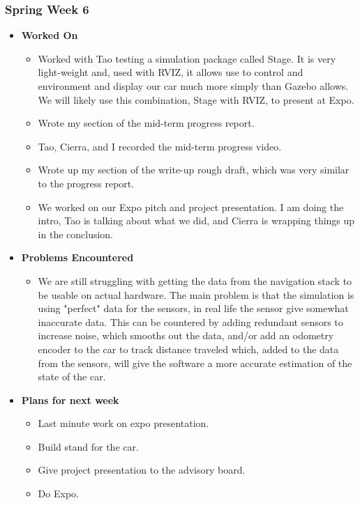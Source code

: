 \documentclass[compsoc,draftclsnofoot,onecolumn,10pt]{IEEEtran}
\begin{document}
\subsubsection{Spring Week 6}
\begin{itemize}
    \item {\textbf{Worked On}}
    \begin{itemize}
        \item Worked with Tao testing a simulation package called Stage. It is very light-weight and, used with RVIZ, it allows use to control and environment and display our car much more simply than Gazebo allows. We will likely use this combination, Stage with RVIZ, to present at Expo.
        \item Wrote my section of the mid-term progress report.
        \item Tao, Cierra, and I recorded the mid-term progress video.
        \item Wrote up my section of the write-up rough draft, which was very similar to the progress report.
        \item We worked on our Expo pitch and project presentation. I am doing the intro, Tao is talking about what we did, and Cierra is wrapping things up in the conclusion.
    \end{itemize}

    \item {\textbf{Problems Encountered}}
    \begin{itemize}
        \item We are still struggling with getting the data from the navigation stack to be usable on actual hardware. The main problem is that the simulation is using "perfect" data for the sensors, in real life the sensor give somewhat inaccurate data. This can be countered by adding redundant sensors to increase noise, which smooths out the data, and/or add an odometry encoder to the car to track distance traveled which, added to the data from the sensors, will give the software a more accurate estimation of the state of the car.
    \end{itemize}

    \item{\textbf{Plans for next week}}
    \begin{itemize}
        \item Last minute work on expo presentation.
        \item Build stand for the car.
        \item Give project presentation to the advisory board.
        \item Do Expo.
    \end{itemize}
\end{itemize}
\end{document}
